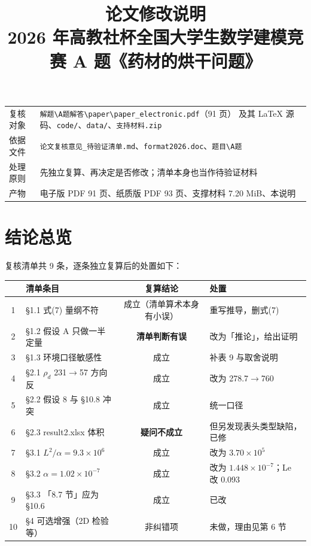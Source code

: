 \documentclass[11pt,a4paper]{ctexart}
\title{\bfseries 论文修改说明\\[2pt]
\large 2026 年高教社杯全国大学生数学建模竞赛 A 题《药材的烘干问题》}
\author{}
\date{}
\newcommand{\src}[1]{\texttt{#1}}
\begin{document}
\maketitle
\vspace{-3.5em}

\begin{center}
\begin{tabular}{@{}p{}p{}@{}}
\toprule
复核对象 & \src{解题\textbackslash A题解答\textbackslash paper\textbackslash paper\_electronic.pdf}（91 页）
        及其 LaTeX 源码、\src{code/}、\src{data/}、\src{支持材料.zip} \\
依据文件 & \src{论文复核意见\_待验证清单.md}、\src{format2026.doc}、\src{题目\textbackslash A题} \\
处理原则 & 先独立复算、再决定是否修改；清单本身也当作待验证材料 \\
产物 & 电子版 PDF 91 页、纸质版 PDF 93 页、支撑材料 7.20 MiB、本说明 \\
\bottomrule
\end{tabular}
\end{center}

\section{结论总览}

复核清单共 9 条，逐条独立复算后的处置如下：

\begin{center}
\small
\begin{tabular}{@{}clcl@{}}
\toprule
 & \textbf{清单条目} & \textbf{复算结论} & \textbf{处置} \\
\midrule
1 & §1.1 式(7) 量纲不符 & 成立（清单算术本身有小误） & 重写推导，删式(7) \\
2 & §1.2 假设 A 只做一半定量 & \textbf{清单判断有误} & 改为「推论」，给出证明 \\
3 & §1.3 环境口径敏感性 & 成立 & 补表 9 与取舍说明 \\
4 & §2.1 $\rho_d$ 231$\to$57 方向反 & 成立 & 改为 278.7$\to$760 \\
5 & §2.2 假设 8 与 §10.8 冲突 & 成立 & 统一口径 \\
6 & §2.3 result2.xlsx 体积 & \textbf{疑问不成立} & 但另发现表头类型缺陷，已修 \\
7 & §3.1 $L^2/\alpha=9.3\times10^6$ & 成立 & 改为 $3.70\times10^5$ \\
8 & §3.2 $\alpha=1.02\times10^{-7}$ & 成立 & 改为 $1.448\times10^{-7}$；Le 改 0.093 \\
9 & §3.3 「8.7 节」应为 §10.6 & 成立 & 已改 \\
10 & §4 可选增强（2D 检验等） & 非纠错项 & 未做，理由见第 6 节 \\
\bottomrule
\end{tabular}
\end{center}
\end{document}
